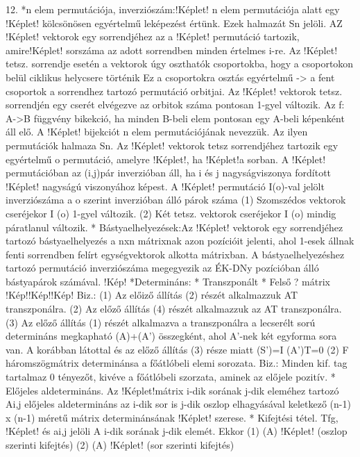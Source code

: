 \documentclass[10pt]{article}
\begin{document}
12.
*n elem permutációja, inverziószám:!Képlet! n elem permutációja alatt egy !Képlet! kölcsönösen egyértelmű leképezést értünk. Ezek halmazát Sn jelöli. AZ !Képlet! vektorok egy sorrendjéhez az a !Képlet! permutáció tartozik, amire!Képlet! sorszáma az adott sorrendben minden értelmes i-re. Az !Képlet! tetsz. sorrendje esetén a vektorok úgy oszthatók csoportokba, hogy a csoportokon  belül ciklikus helycsere történik Ez a csoportokra osztás egyértelmű -> a fent csoportok a sorrendhez tartozó permutáció orbitjai. Az !Képlet! vektorok tetsz. sorrendjén egy cserét elvégezve az orbitok száma pontosan 1-gyel változik. Az f: A->B függvény bikekció, ha minden B-beli elem pontosan egy A-beli képenként áll elő. A !Képlet! bijekciót n elem permutációjának nevezzük. Az ilyen permutációk halmaza Sn. Az !Képlet! vektorok tetsz sorrendjéhez tartozik egy egyértelmű o permutáció, amelyre !Képlet!, ha !Képlet!a sorban. A !Képlet! permutációban az (i,j)pár inverzióban áll, ha i és j nagyságviszonya fordított !Képlet! nagyságú viszonyához képest. A !Képlet! permutáció I(o)-val jelölt inverziószáma a o szerint inverzióban álló párok száma (1) Szomszédos vektorok cseréjekor I (o) 1-gyel változik. (2) Két tetsz. vektorok cseréjekor I (o) mindig páratlanul változik.
* Bástyaelhelyezések:Az !Képlet! vektorok egy sorrendjéhez tartozó bástyaelhelyezés a nxn mátrixnak azon pozícióit jelenti, ahol 1-esek állnak fenti sorrendben felírt egységvektorok alkotta mátrixban. A bástyaelhelyezéshez tartozó permutáció inverziószáma megegyezik az ÉK-DNy pozícióban álló bástyapárok számával.
!Kép!
*Determináns:  * Transzponált  * Felső ? mátrix !Kép!!Kép!!Kép!
Biz.: (1) Az előiző állítás (2) részét alkalmazzuk AT transzponálra.  (2) Az előző állítás (4) részét alkalmazzuk az AT transzponálra. (3) Az előző állítás (1)  részét alkalmazva a transzponálra a lecserélt sorú determináns megkapható (A)+(A') összegként, ahol A'-nek két egyforma sora van. A korábban látottal és az előző állítás (3) része miatt (S')=I (A')T=0
(2) F háromszögmátrix determinánsa a főátlóbeli elemi sorozata. Biz.: Minden kif. tag tartalmaz 0 tényezőt, kivéve a főátlóbeli szorzata, aminek az előjele pozitív.
* Előjeles aldetermináns. Az !Képlet!mátrix i-dik sorának j-dik eleméhez tartozó Ai,j előjeles aldetermináns az i-dik sor is j-dik oszlop elhagyásával keletkező (n-1) x (n-1) méretű mátrix determinánsának !Képlet! szerese.
* Kifejtési tétel. Tfg, !Képlet! és ai,j jelöli A i-dik sorának j-dik elemét. Ekkor (1)  (A) !Képlet! (oszlop szerinti kifejtés) (2)  (A) !Képlet! (sor szerinti kifejtés)
\end{document}
